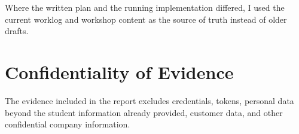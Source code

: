 Where the written plan and the running implementation differed, I used the
current worklog and workshop content as the source of truth instead of older
drafts.

\section{Confidentiality of Evidence}

The evidence included in the report excludes credentials, tokens, personal
data beyond the student information already provided, customer data, and other
confidential company information.